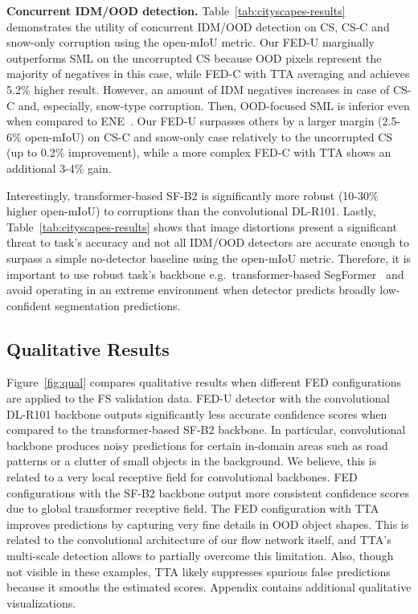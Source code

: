 \documentclass[accepted, startpage]{uai2023}
\newcommand{\eg}{e.g.}
\begin{document}
\textbf{Concurrent IDM/OOD detection.} Table~\ref{tab:cityscapes-results} demonstrates the utility of concurrent IDM/OOD detection on CS, CS-C and snow-only corruption using the open-mIoU metric. Our FED-U marginally outperforms SML on the uncorrupted CS because OOD pixels represent the majority of negatives in this case, while FED-C with TTA averaging and  achieves 5.2\% higher result. However, an amount of IDM negatives increases in case of CS-C and, especially, snow-type corruption. Then, OOD-focused SML is inferior even when compared to ENE~\citep{NEURIPS2020_f5496252}. Our FED-U surpasses others by a larger margin (2.5-6\% open-mIoU) on CS-C and snow-only case relatively to the uncorrupted CS (up to 0.2\% improvement), while a more complex FED-C with TTA shows an additional 3-4\% gain. 

Interestingly, transformer-based SF-B2 is significantly more robust (10-30\% higher open-mIoU) to corruptions than the convolutional DL-R101. Lastly, Table~\ref{tab:cityscapes-results} shows that image distortions present a significant threat to task's accuracy and not all IDM/OOD detectors are accurate enough to surpass a simple no-detector baseline using the open-mIoU metric. Therefore, it is important to use robust task's backbone \eg~transformer-based SegFormer~\citep{zhou22m} and avoid operating in an extreme environment when detector predicts broadly low-confident segmentation predictions.

\subsection{Qualitative Results}
\label{subsec:qual_eval}
Figure~\ref{fig:qual} compares qualitative results when different FED configurations are applied to the FS validation data. FED-U detector with the convolutional DL-R101 backbone outputs significantly less accurate confidence scores when compared to the transformer-based SF-B2 backbone. In particular, convolutional backbone produces noisy predictions for certain in-domain areas such as road patterns or a clutter of small objects in the background. We believe, this is related to a very local receptive field for convolutional backbones. FED configurations with the SF-B2 backbone output more consistent confidence scores due to global transformer receptive field. The FED configuration with TTA improves predictions by capturing very fine details in OOD object shapes. This is related to the convolutional architecture of our flow network itself, and TTA's multi-scale detection allows to partially overcome this limitation. Also, though not visible in these examples, TTA likely suppresses spurious false predictions because it smooths the estimated scores. Appendix contains additional qualitative visualizations.
\end{document}
